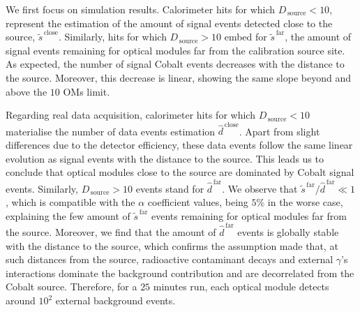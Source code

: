 We first focus on simulation results.
Calorimeter hits for which $D_{\,\text{source}}<10$, represent the estimation of the amount of signal events detected close to the source, $\tilde{s}^{\,\text{close}}$.
Similarly, hits for which $D_{\,\text{source}}>10$ embed for $\tilde{s}^{\,\text{far}}$, the amount of signal events remaining for optical modules far from the calibration source site.
As expected, the number of signal Cobalt events decreases with the distance to the source.
Moreover, this decrease is linear, showing the same slope beyond and above the $10$ OMs limit.

Regarding real data acquisition, calorimeter hits for which $D_{\,\text{source}}<10$ materialise the number of data events estimation $\hat{d}^{\,\text{close}}$.
Apart from slight differences due to the detector efficiency, these data events follow the same linear evolution as signal events with the distance to the source.
This leads us to conclude that optical modules close to the source are dominated by Cobalt signal events.
Similarly, $D_{\,\text{source}}>10$ events stand for $\hat{d}^{\,\text{far}}$.
We observe that $\tilde{s}^{\,\text{far}}/\hat{d}^{\,\text{far}} \ll 1$, which is compatible with the $\alpha$ coefficient values, being $5\%$ in the worse case, explaining the few amount of $\tilde{s}^{\,\text{far}}$ events remaining for optical modules far from the source.
Moreover, we find that the amount of $\hat{d}^{\,\text{far}}$ events is globally stable with the distance to the source, which confirms the assumption made that, at such distances from the source, radioactive contaminant decays and external $\gamma$'s interactions dominate the background contribution and are decorrelated from the Cobalt source.
Therefore, for a $25$ minutes run, each optical module detects around $10^{2}$ external background events.

